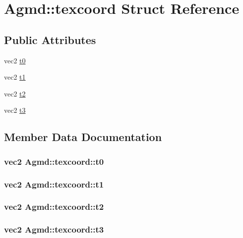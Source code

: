 \hypertarget{struct_agmd_1_1texcoord}{\section{Agmd\+:\+:texcoord Struct Reference}
\label{struct_agmd_1_1texcoord}
}
\subsection*{Public Attributes}
\begin{DoxyCompactItemize}
\item 
vec2 \hyperlink{struct_agmd_1_1texcoord_ad56040c7123eaa241f500c293aa5a8d5}{t0}
\item 
vec2 \hyperlink{struct_agmd_1_1texcoord_ac1656b0fdd0a03493ba975f2d52125e0}{t1}
\item 
vec2 \hyperlink{struct_agmd_1_1texcoord_a814e6bfc781b3d2f4fa0ad1f0929a785}{t2}
\item 
vec2 \hyperlink{struct_agmd_1_1texcoord_a27e499f258549c146d242e288604e2d7}{t3}
\end{DoxyCompactItemize}


\subsection{Member Data Documentation}
\hypertarget{struct_agmd_1_1texcoord_ad56040c7123eaa241f500c293aa5a8d5}{
\subsubsection[{t0}]{\setlength{\rightskip}{0pt plus 5cm}vec2 Agmd\+::texcoord\+::t0}}\label{struct_agmd_1_1texcoord_ad56040c7123eaa241f500c293aa5a8d5}
\hypertarget{struct_agmd_1_1texcoord_ac1656b0fdd0a03493ba975f2d52125e0}{
\subsubsection[{t1}]{\setlength{\rightskip}{0pt plus 5cm}vec2 Agmd\+::texcoord\+::t1}}\label{struct_agmd_1_1texcoord_ac1656b0fdd0a03493ba975f2d52125e0}
\hypertarget{struct_agmd_1_1texcoord_a814e6bfc781b3d2f4fa0ad1f0929a785}{
\subsubsection[{t2}]{\setlength{\rightskip}{0pt plus 5cm}vec2 Agmd\+::texcoord\+::t2}}\label{struct_agmd_1_1texcoord_a814e6bfc781b3d2f4fa0ad1f0929a785}
\hypertarget{struct_agmd_1_1texcoord_a27e499f258549c146d242e288604e2d7}{
\subsubsection[{t3}]{\setlength{\rightskip}{0pt plus 5cm}vec2 Agmd\+::texcoord\+::t3}}\label{struct_agmd_1_1texcoord_a27e499f258549c146d242e288604e2d7}


